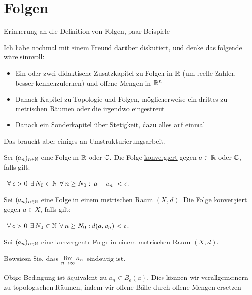 \chapter{Folgen}

\begin{example}
    Erinnerung an die Definition von Folgen, paar Beispiele
\end{example}

\begin{query}
    Ich habe nochmal mit einem Freund darüber diskutiert, und denke das folgende wäre sinnvoll:
    \begin{itemize}
        \item Ein oder zwei didaktische Zusatzkapitel zu Folgen in $\mathbb{R}$ (um reelle Zahlen besser kennenzulernen) und offene Mengen in $\mathbb{R}^n$
        \item Danach Kapitel zu Topologie und Folgen, möglicherweise ein drittes zu metrischen Räumen oder die irgendwo eingestreut
        \item Danach ein Sonderkapitel über Stetigkeit, dazu alles auf einmal
    \end{itemize}
    Das braucht aber einiges an Umstrukturierungsarbeit.
\end{query}

\begin{definition}
    Sei $(a_n)_{n \in \mathbb{N}}$ eine Folge in $\mathbb{R}$ oder $\mathbb{C}$. Die Folge \underline{konvergiert} gegen $a \in \mathbb{R}$ oder $\mathbb{C}$, falls gilt:

    $\forall \epsilon > 0 \exists N_0 \in \N \forall n \geq N_0: |a - a_n| < \epsilon$.
\end{definition}

\begin{definition}
    Sei $(a_n)_{n \in \mathbb{N}}$ eine Folge in einem metrischen Raum $(X, d)$. Die Folge \underline{konvergiert} gegen $a \in X$, falls gilt:

    $\forall \epsilon > 0 \exists N_0 \in \N \forall n \geq N_0: d(a, a_n) < \epsilon$.
\end{definition}

\begin{exercise}
    Sei $(a_n)_{n \in \mathbb{N}}$ eine konvergente Folge in einem metrischen Raum $(X, d)$.

    Beweisen Sie, dass $\lim\limits_{n \rightarrow \infty} a_n$ eindeutig ist.
\end{exercise}

Obige Bedingung ist äquivalent zu $a_n \in B_{\epsilon}(a)$. Dies können wir verallgemeinern zu topologischen Räumen, indem wir offene Bälle durch offene Mengen ersetzen


